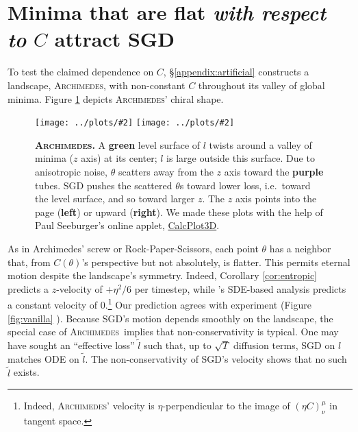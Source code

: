 \documentclass[openany, notitlepage, justified]{tufte-book}
\newcommand{\ofsix}[1]{
    {\tiny \raisebox{0.04cm}{$\substack{
        \ifthenelse{\equal{#1}{0}}{{\color{moor}\blacksquare}}{\square}
        \ifthenelse{\equal{#1}{2}}{{\color{moor}\blacksquare}}{\square}    
        \ifthenelse{\equal{#1}{4}}{{\color{moor}\blacksquare}}{\square} \\
        \ifthenelse{\equal{#1}{1}}{{\color{moor}\blacksquare}}{\square}    
        \ifthenelse{\equal{#1}{3}}{{\color{moor}\blacksquare}}{\square}
        \ifthenelse{\equal{#1}{5}}{{\color{moor}\blacksquare}}{\square}
    }$}}%
}
\theoremstyle{plain}
\theoremstyle{definition}
\newcommand{\pmoo}[2]{\texttt{[image: ../plots/\#2]}}
\newcommand{\Archimedes}{\textsc{Archimedes}}
\begin{document}
    \section{Minima that are flat \emph{with respect to} $C$ attract SGD}
        \label{subsect:entropic}
        To test the claimed dependence on $C$, \S\ref{appendix:artificial}
        constructs a landscape, \Archimedes, with non-constant $C$ throughout
        its valley of global minima.  Figure \ref{fig:archimedes} 
        depicts \Archimedes' chiral shape.
        \begin{figure}
            \centering
            \pmoo{3cm}{from-above}
            \pmoo{3cm}{from-side}
            \caption{
                \textbf{\Archimedes.}
                A \textbf{green} level surface of $l$ twists around a valley of
                minima ($z$ axis) at its center; $l$ is large outside this
                surface.  Due to anisotropic noise, $\theta$ scatters away
                from the $z$ axis toward the \textbf{purple} tubes.
                SGD pushes the scattered $\theta$s toward lower loss, i.e.\
                toward the level surface, and so toward larger $z$.
                The $z$ axis points into the page (\textbf{left}) or upward
                (\textbf{right}).
                We made these plots with
                the help of Paul Seeburger's online applet,
                \href{https://www.monroecc.edu/faculty/paulseeburger/calcnsf/CalcPlot3D/}{CalcPlot3D}.
            }
            \label{fig:archimedes}
        \end{figure}
        As in
        Archimedes' screw or Rock-Paper-Scissors, each point $\theta$ has a
        neighbor that, from $C(\theta)$'s perspective but not absolutely, is
        flatter.  This permits eternal motion despite the landscape's symmetry.
        Indeed, Corollary \ref{cor:entropic} predicts 
        a $z$-velocity of $+\eta^2/6$ per timestep, while \citep{ch18}'s
        SDE-based analysis predicts a constant velocity of $0$.\footnote{
            Indeed, \Archimedes' velocity is $\eta$-perpendicular to the image
            of $(\eta C)^\mu_\nu$ in tangent space.
        }
        Our prediction agrees with experiment (Figure
        \ref{fig:vanilla}\ofsix{4}).
        Because SGD's motion depends smoothly on the landscape, the special
        case of \Archimedes\ implies that non-conservativity is typical.
        One may have sought an ``effective loss'' $\tilde{l}$ such that, up to
        $\sqrt{T}$ diffusion terms, SGD on $l$ matches ODE on $\tilde{l}$.  The
        non-conservativity of SGD's velocity shows that no such $\tilde{l}$
        exists.
\end{document}
